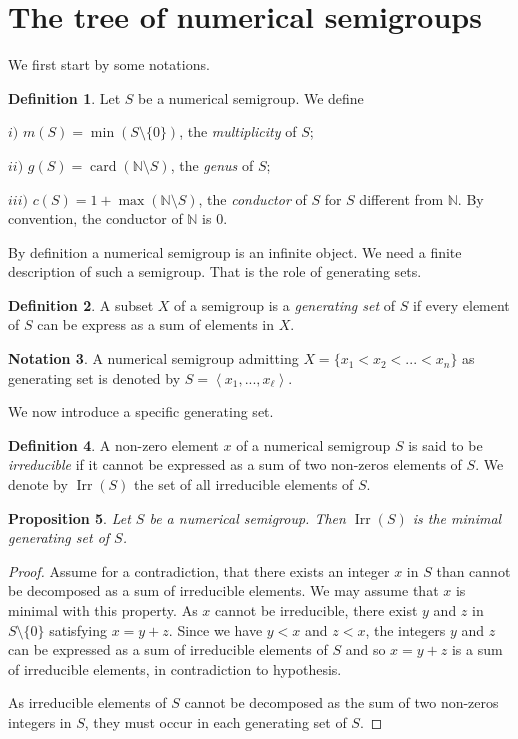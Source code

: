 \documentclass[reqno,11pt]{amsart}
\theoremstyle{plain}
\newtheorem{prop}{Proposition}[section]
\theoremstyle{definition}
\newtheorem{defi}[prop]{Definition}
\newtheorem{nota}[prop]{Notation}
\newcommand{\NN}{\mathbb{N}}
\DeclareMathOperator{\Irr}{Irr}
\DeclareMathOperator{\card}{card}
\begin{document}
\section{The tree of numerical semigroups}
\label{S:Tree}
We first start by some notations.

\begin{defi}
Let $S$ be a numerical semigroup. We define 

$i)$ $m(S)=\min(S\setminus\{0\})$, the \emph{multiplicity} of $S$;

$ii)$ $g(S)=\card(\NN\setminus S)$, the \emph{genus} of $S$;

$iii)$ $c(S)=1+\max(\NN\setminus S)$, the \emph{conductor} of $S$ for $S$ different from $\NN$. By convention, the conductor of $\NN$ is $0$. 
\end{defi}

By definition a numerical semigroup is an infinite object. 
We need a finite description of such a semigroup. 
That is the role of generating sets.


\begin{defi}
A subset $X$ of a semigroup is a \emph{generating set} of $S$ if every element of $S$ can be express as a sum of elements in $X$. 
\end{defi}


\begin{nota}
A numerical semigroup admitting $X=\{x_1<x_2<...<x_n\}$ as generating set is denoted  by $S=\left<x_1,...,x_\ell\right>$.
\end{nota}

We now introduce a specific generating set.

\begin{defi}
A non-zero element $x$ of a numerical semigroup $S$ is said to be \emph{irreducible} if it cannot be expressed as a sum of two non-zeros elements of $S$.  
We denote by $\Irr(S)$ the set of all irreducible elements of $S$.
\end{defi}


\begin{prop}
Let $S$ be a numerical semigroup.
Then $\Irr(S)$ is the minimal generating set of $S$.
\end{prop} 

\begin{proof}
Assume for a contradiction, that there exists an integer  $x$ in $S$ than cannot be decomposed as a sum of irreducible elements. 
We may assume that $x$ is  minimal with this property. 
As  $x$ cannot be irreducible, there exist $y$ and $z$ in~$S\setminus\{0\}$ satisfying $x=y+z$. 
Since we have $y<x$ and $z<x$, the integers $y$ and $z$ can be expressed as a sum of irreducible elements of $S$ and so $x=y+z$ is a sum of irreducible elements, in contradiction to hypothesis. 

As irreducible elements of $S$ cannot be decomposed as the sum of two non-zeros integers in $S$, they must occur in each generating set of $S$.
\end{proof}
\end{document}
